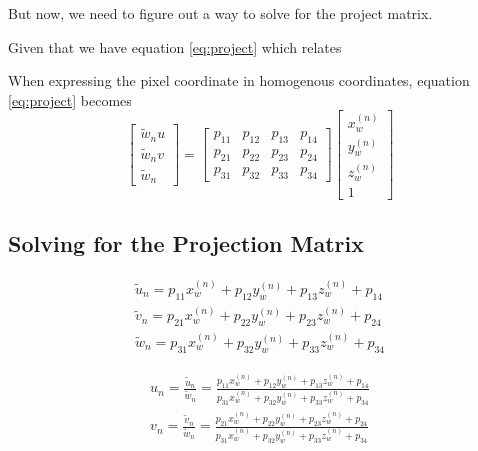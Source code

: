 But now, we need to figure out a way to solve for the project matrix.

Given that we have equation \ref{eq:project} which relates



When expressing the pixel coordinate in homogenous coordinates, equation \ref{eq:project} becomes
\begin{equation}
    \begin{bmatrix}
        \widetilde{w}_n u \\ \widetilde{w}_n v \\ \widetilde{w}_n
    \end{bmatrix}
    =
    \begin{bmatrix}
        p_{11} & p_{12} & p_{13} & p_{14} \\
        p_{21} & p_{22} & p_{23} & p_{24} \\
        p_{31} & p_{32} & p_{33} & p_{34}
    \end{bmatrix}
    \begin{bmatrix}
        x_w^{(n)} \\ y_w^{(n)} \\ z_w^{(n)} \\ 1
    \end{bmatrix}
\end{equation}



\subsection{Solving for the Projection Matrix}

\begin{align*}
    \widetilde{u}_n = p_{11}x_w^{(n)} + p_{12}y_w^{(n)} + p_{13}z_w^{(n)} + p_{14} \\
    \widetilde{v}_n = p_{21}x_w^{(n)} + p_{22}y_w^{(n)} + p_{23}z_w^{(n)} + p_{24} \\
    \widetilde{w}_n = p_{31}x_w^{(n)} + p_{32}y_w^{(n)} + p_{33}z_w^{(n)} + p_{34}
\end{align*}

\begin{align*}
    u_n = \frac{\widetilde{u}_n}{\widetilde{w}_n} = \frac{p_{11}x_w^{(n)} + p_{12}y_w^{(n)} + p_{13}z_w^{(n)} + p_{14}}{p_{31}x_w^{(n)} + p_{32}y_w^{(n)} + p_{33}z_w^{(n)} + p_{34}} \\
    v_n = \frac{\widetilde{v}_n}{\widetilde{w}_n} = \frac{p_{21}x_w^{(n)} + p_{22}y_w^{(n)} + p_{23}z_w^{(n)} + p_{24}}{p_{31}x_w^{(n)} + p_{32}y_w^{(n)} + p_{33}z_w^{(n)} + p_{34}}
\end{align*}

